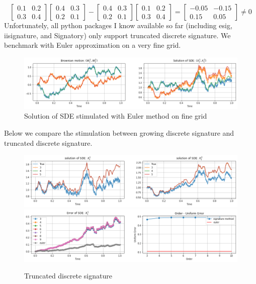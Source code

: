 \documentclass[12pt]{report}
\theoremstyle{definition}
\theoremstyle{remark}
\begin{document}
\begin{equation*}
  \begin{bmatrix}
    0.1& 0.2\\
    0.3& 0.4
  \end{bmatrix}
  \begin{bmatrix}
    0.4& 0.3\\
    0.2& 0.1
  \end{bmatrix} 
  - 
  \begin{bmatrix}
    0.4& 0.3\\
    0.2& 0.1
  \end{bmatrix}
  \begin{bmatrix}
    0.1& 0.2\\
    0.3& 0.4
  \end{bmatrix}
  = 
  \begin{bmatrix}
    -0.05& -0.15\\
    0.15& 0.05
  \end{bmatrix} \neq 0
\end{equation*} 
Unfortunately, all python packages I know available so far (including esig, iisignature, and Signatory) only support truncated discrete signature. We benchmark with Euler approximation on a very fine grid.
\begin{figure}[H]
    \centering
    \includegraphics[width=\textwidth]{figs/sde1.png}
    \caption{Solution of SDE stimulated with Euler method on fine grid}
\end{figure}
Below we compare the stimulation between growing discrete signature and truncated discrete signature.
\begin{figure}[H]
    \centering
    \includegraphics[width=\textwidth]{figs/sde2.png}
    \includegraphics[width=\textwidth]{figs/sde3.png}
    \caption{Truncated discrete signature}
\end{figure}
\end{document}
